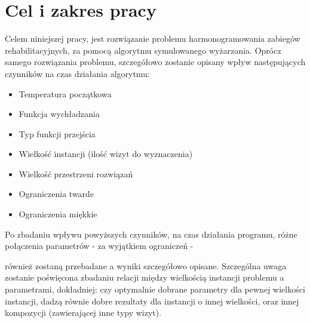 \chapter{Cel i zakres pracy} Celem niniejszej pracy, jest rozwiązanie problemu
harmonogramowania zabiegów rehabilitacyjnych, za pomocą algorytmu symulowanego
wyżarzania. Oprócz samego rozwiązania problemu, szczegółowo zostanie opisany
wpływ następujących czynników na czas działania algorytmu:

\begin{itemize} \item Temperatura początkowa \item Funkcja wychładzania \item
Typ funkcji przejścia \item Wielkość instancji (ilość wizyt do wyznaczenia)
\item Wielkość przestrzeni rozwiązań \item Ograniczenia twarde \item
Ograniczenia miękkie \end{itemize} Po zbadaniu wpływu powyższych czynników, na
czas działania programu, różne połączenia parametrów - za wyjątkiem ograniczeń -

również zostaną przebadane a wyniki szczegółowo opisane.
Szczególna uwaga zostanie poświęcona zbadaniu relacji między wielkością
instancji problemu a parametrami, dokładniej: czy optymalnie dobrane parametry
dla pewnej wielkości instancji, dadzą równie dobre rezultaty dla instancji o
innej wielkości, oraz innej kompozycji (zawierającej inne typy wizyt).
